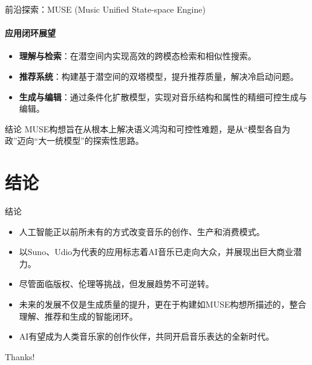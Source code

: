 \documentclass{beamer}
\begin{document}
\begin{frame}{前沿探索：MUSE (Music Unified State-space Engine)}
  \framesubtitle{应用闭环展望}
  \begin{itemize}
    \item \textbf{理解与检索}：在潜空间内实现高效的跨模态检索和相似性搜索。
    \item \textbf{推荐系统}：构建基于潜空间的双塔模型，提升推荐质量，解决冷启动问题。
    \item \textbf{生成与编辑}：通过条件化扩散模型，实现对音乐结构和属性的精细可控生成与编辑。
  \end{itemize}
  \vspace{1cm}
  \begin{alertblock}{结论}
    MUSE构想旨在从根本上解决语义鸿沟和可控性难题，是从“模型各自为政”迈向“大一统模型”的探索性思路。
  \end{alertblock}
\end{frame}

\section{结论}
\begin{frame}{结论}
  \begin{itemize}
    \item 人工智能正以前所未有的方式改变音乐的创作、生产和消费模式。
    \item 以Suno、Udio为代表的应用标志着AI音乐已走向大众，并展现出巨大商业潜力。
    \item 尽管面临版权、伦理等挑战，但发展趋势不可逆转。
    \item 未来的发展不仅是生成质量的提升，更在于构建如MUSE构想所描述的，整合理解、推荐和生成的智能闭环。
    \item AI有望成为人类音乐家的创作伙伴，共同开启音乐表达的全新时代。
  \end{itemize}
\end{frame}

\begin{frame}
  \begin{center}
    \Huge Thanks!
  \end{center}
\end{frame}
\end{document}
